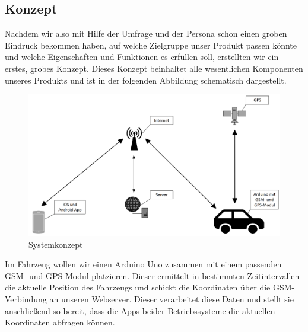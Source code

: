 \subsection{Konzept} 
Nachdem wir also mit Hilfe der Umfrage und der Persona schon einen groben Eindruck bekommen haben, auf welche Zielgruppe unser Produkt passen könnte und welche Eigenschaften und Funktionen es erfüllen soll, erstellten wir ein erstes, grobes Konzept. Dieses Konzept beinhaltet alle wesentlichen Komponenten unseres Produkts und ist in der folgenden Abbildung schematisch dargestellt.
\begin{figure} [H]
	\begin{center}
		\includegraphics[width=1\textwidth]{Bilder/Konzept_Konzept.png}
		\caption{Systemkonzept}
		\label{konzept}
	\end{center}
\end{figure}
Im Fahrzeug wollen wir einen Arduino Uno zusammen mit einem passenden GSM- und GPS-Modul platzieren. Dieser ermittelt in bestimmten Zeitintervallen die aktuelle Position des Fahrzeugs und schickt die Koordinaten über die GSM-Verbindung an unseren Webserver. Dieser verarbeitet diese Daten und stellt sie anschließend so bereit, dass die Apps beider Betriebssysteme die aktuellen Koordinaten abfragen können.

